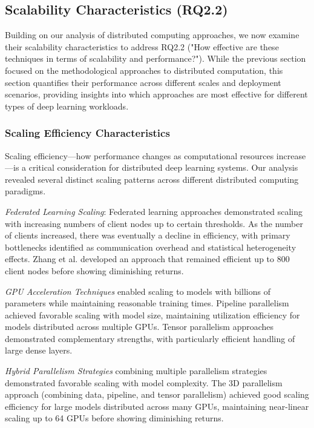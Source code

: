 \subsection{Scalability Characteristics (RQ2.2)}
Building on our analysis of distributed computing approaches, we now examine their scalability characteristics to address RQ2.2 ("How effective are these techniques in terms of scalability and performance?"). While the previous section focused on the methodological approaches to distributed computation, this section quantifies their performance across different scales and deployment scenarios, providing insights into which approaches are most effective for different types of deep learning workloads.

\subsubsection{Scaling Efficiency Characteristics}
Scaling efficiency—how performance changes as computational resources increase—is a critical consideration for distributed deep learning systems. Our analysis revealed several distinct scaling patterns across different distributed computing paradigms.

\textit{Federated Learning Scaling}: Federated learning approaches demonstrated scaling with increasing numbers of client nodes up to certain thresholds. As the number of clients increased, there was eventually a decline in efficiency, with primary bottlenecks identified as communication overhead and statistical heterogeneity effects. Zhang et al. \citep{Zhang20229876} developed an approach that remained efficient up to 800 client nodes before showing diminishing returns.

\textit{GPU Acceleration Techniques} enabled scaling to models with billions of parameters while maintaining reasonable training times. Pipeline parallelism achieved favorable scaling with model size, maintaining utilization efficiency for models distributed across multiple GPUs. Tensor parallelism approaches demonstrated complementary strengths, with particularly efficient handling of large dense layers.

\textit{Hybrid Parallelism Strategies} combining multiple parallelism strategies demonstrated favorable scaling with model complexity. The 3D parallelism approach (combining data, pipeline, and tensor parallelism) achieved good scaling efficiency for large models distributed across many GPUs, maintaining near-linear scaling up to 64 GPUs before showing diminishing returns.

